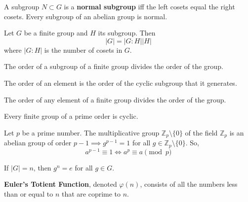  \begin{definition}
    A subgroup $N \subset G$ is a \textbf{normal subgroup} iff the left cosets equal the right cosets. Every subgroup of an abelian group is normal. 
  \end{definition}

  \begin{theorem}
    Let $G$ be a finite group and $H$ its subgroup. Then 
    \begin{equation}
      |G| = |G:H| |H|
    \end{equation}
    where $|G:H|$ is the number of cosets in $G$. 
  \end{theorem}

  \begin{corollary}
    The order of a subgroup of a finite group divides the order of the group. 
  \end{corollary}

  \begin{definition}
    The order of an element is the order of the cyclic subgroup that it generates. 
  \end{definition}

  \begin{corollary}
    The order of any element of a finite group divides the order of the group. 
  \end{corollary}

  \begin{corollary}
    Every finite group of a prime order is cyclic. 
  \end{corollary}

  \begin{theorem}
    Let $p$ be a prime number. The multiplicative group $\mathbb{Z}_{p} \setminus \{0\}$ of the field $\mathbb{Z}_{p}$ is an abelian group of order $p-1 \implies g^{p-1} = 1$ for all $g \in \mathbb{Z}_{p} \setminus \{0\}$. So,
    \begin{equation}
      a^{p-1} \equiv 1 \iff a^{p} \equiv a \pmod{p}
    \end{equation}
  \end{theorem}

  \begin{corollary}
    If $|G| = n$, then $g^{n} = e$ for all $g \in G$. 
  \end{corollary}

  \begin{definition}
    \textbf{Euler's Totient Function}, denoted $\varphi(n)$, consists of all the numbers less than or equal to $n$ that are coprime to $n$. 
  \end{definition}

